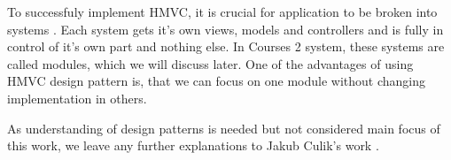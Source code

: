 



To successfuly implement HMVC, it is crucial for application to be broken into systems \cite{hmvc}. Each system gets it's own views, models and controllers and is fully in control of it's own part and nothing else. In Courses 2 system, these systems are called modules, which we will discuss later. One of the advantages of using HMVC design pattern is, that we can focus on one module without changing implementation in others.


As understanding of design patterns is needed but not considered main focus of this work, we leave any further explanations to Jakub Culik's work \cite{culik}.


